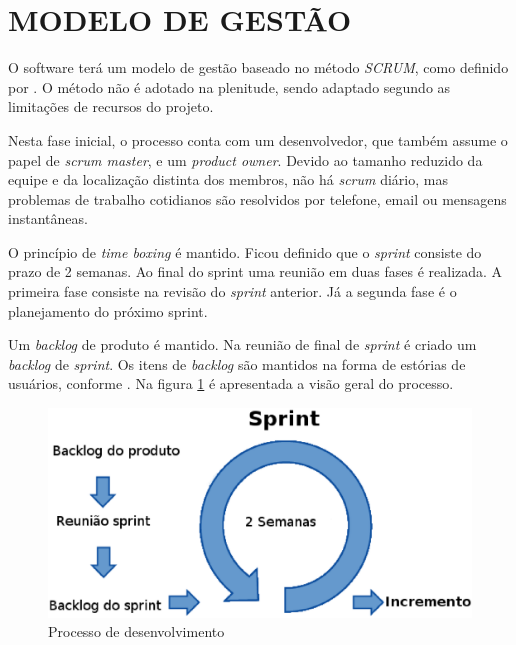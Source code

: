 \section[MODELO DE GESTÃO]{MODELO DE GESTÃO}
O software terá um modelo de gestão baseado no método \emph{SCRUM}, como definido por \cite{schwaber2002}.
O método não é adotado na plenitude, sendo adaptado segundo as limitações de recursos do projeto.

Nesta fase inicial, o processo conta com um desenvolvedor, que também assume o papel de \emph{scrum master}, e um \emph{product owner}. 
Devido ao tamanho reduzido da equipe e da localização distinta dos membros, não há \emph{scrum} diário, mas problemas de trabalho cotidianos são resolvidos por telefone, email ou mensagens instantâneas. 

O princípio de \emph{time boxing} é mantido. Ficou definido que o \emph{sprint} consiste do prazo de 2 semanas. Ao final do sprint uma reunião em duas fases é realizada. A primeira fase consiste na revisão do \emph{sprint} anterior. Já a segunda fase é o planejamento do próximo sprint.

Um \emph{backlog} de produto é mantido. Na reunião de final de \emph{sprint} é criado um \emph{backlog} de \emph{sprint}. 
Os itens de \emph{backlog} são mantidos na forma de estórias de usuários, conforme \cite{cohn2004}.
Na figura \ref{scrum_projeto} é apresentada a visão geral do processo.

\begin{figure}[ht]
	\centering
	\includegraphics[width=15cm]{figuras/scrum_projeto.eps}
	\caption{Processo de desenvolvimento}
	\label{scrum_projeto}
\end{figure}
